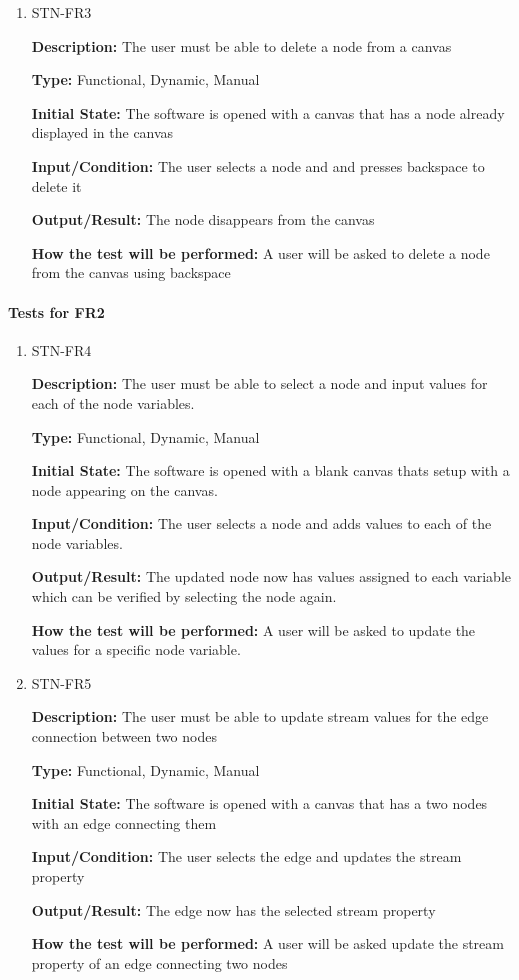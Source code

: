 \documentclass[12pt, titlepage]{article}
\begin{document}
\begin{enumerate}
\item{STN-FR3\\}


\textbf{Description:} The user must be able to delete a node from a canvas

\textbf{Type:} Functional, Dynamic, Manual

\textbf{Initial State:} The software is opened with a canvas that has a node already displayed in the canvas

\textbf{Input/Condition:} The user selects a node and and presses backspace to delete it

\textbf{Output/Result:} The node disappears from the canvas

\textbf{How the test will be performed:} A user will be asked to delete a node from the canvas using backspace

\end{enumerate}

	
\paragraph{Tests for FR2}

\begin{enumerate}

\item{STN-FR4\\}

\textbf{Description:} The user must be able to select a node and input values for each of the node variables.

\textbf{Type:} Functional, Dynamic, Manual

\textbf{Initial State:} The software is opened with a blank canvas thats setup with a node appearing on the canvas.

\textbf{Input/Condition:} The user selects a node and adds values to each of the node variables. 

\textbf{Output/Result:} The updated node now has values assigned to each variable which can be verified by selecting the node again.

\textbf{How the test will be performed:} A user will be asked to update the values for a specific node variable.
					
\item{STN-FR5\\}


\textbf{Description:} The user must be able to update stream values for the edge connection between two nodes

\textbf{Type:} Functional, Dynamic, Manual

\textbf{Initial State:} The software is opened with a canvas that has a two nodes with an edge connecting them

\textbf{Input/Condition:} The user selects the edge and updates the stream property

\textbf{Output/Result:} The edge now has the selected stream property

\textbf{How the test will be performed:} A user will be asked update the stream property of an edge connecting two nodes

\end{enumerate}
\end{document}
